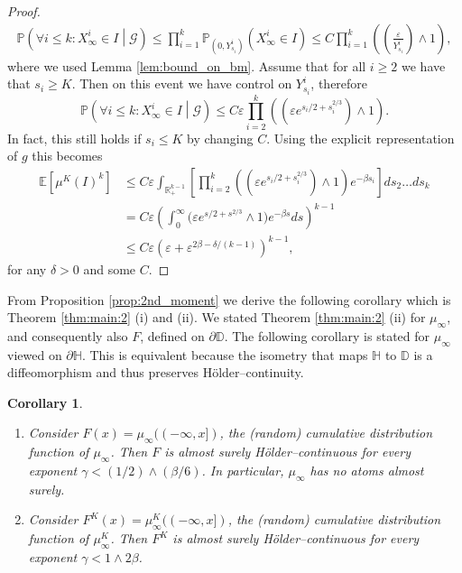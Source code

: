 \documentclass{article}
\newtheorem{cor}[thm]{Corollary}
\theoremstyle{definition}
\numberwithin{equation}{section}
\numberwithin{thm}{section}
\newcommand*{\eps}{\ensuremath{\varepsilon}}            %
\newcommand*{\RR}{\ensuremath{\mathbb{R}}}	        	%
\newcommand*{\EE}{\ensuremath{\mathbb{E}}}	        	%
\newcommand*{\PP}{\ensuremath{\mathbb{P}}}	        	%
\newcommand*{\DD}{\ensuremath{\mathbb{D}}}	        	%
\newcommand*{\HH}{\ensuremath{\mathbb{H}}}	        	%
\begin{document}
\begin{proof}
    \begin{align*}
        \PP\left(\forall i\leq k: X_\infty^i \in I \middle\vert \mathcal{G}\right) \leq \prod_{i=1}^k \PP_{(0,Y_{s_i}^i)}\left(X_\infty^i\in I\right) \leq C \prod_{i=1}^k \left(\left(\frac{\eps}{Y_{s_i}^i}\right)\wedge 1\right),
    \end{align*}
    where we used Lemma \ref{lem:bound_on_bm}. Assume that for all $i\geq 2$ we have that $s_i\geq K$. Then on this event we have control on $Y_{s_i}^i$, therefore
    \begin{equation*}
        \PP\left(\forall i\leq k: X_\infty^i \in I \middle\vert \mathcal{G}\right) \leq C \eps \prod_{i=2}^k \left(\left(\eps e^{s_i/2+s_i^{2/3}}\right)\wedge 1\right).
    \end{equation*}
    In fact, this still holds if $s_i\leq K$ by changing $C$.
    Using the explicit representation of $g$ this becomes
    \begin{align*}
        \EE\left[\mu^K(I)^k\right] &\leq C \eps \int_{\RR_+^{k-1}} \left[\prod_{i=2}^k \left(\left(\eps e^{s_i/2+s_i^{2/3}}\right)\wedge 1 \right)e^{-\beta s_i}\right] ds_2\ldots ds_{k}\\
        &= C\eps \left(\int_0^\infty \big(\eps e^{s/2+s^{2/3}} \wedge 1\big)e^{-\beta s}ds\right)^{k-1} \\
        &\leq C \eps\left(\eps+ \eps^{2\beta -\delta/(k-1)} \right)^{k-1},
    \end{align*}
    for any $\delta >0$ and some $C$. 
\end{proof}

From Proposition \ref{prop:2nd_moment} we derive the following corollary which is Theorem \ref{thm:main:2} (i) and (ii). We stated Theorem \ref{thm:main:2} (ii) for $\mu_\infty$, and consequently also $F$, defined on $\partial \DD$. The following corollary is stated for $\mu_\infty$ viewed on $\partial\HH$. {T}his is equivalent because the isometry that maps $\HH$ to $\DD$ is a diffeomorphism and thus preserves Hölder--continuity.

\begin{cor}\label{cor:hoelder} \hspace{1cm}
    \begin{enumerate}
    \item 
    Consider $F(x)=\mu_\infty((-\infty,x])$, the (random) cumulative distribution function of $\mu_\infty$. Then $F$ is almost surely Hölder--continuous for every exponent $\gamma < (1/2) \wedge (\beta/6)$. In particular, $\mu_\infty$ has no atoms almost surely. 

    \item 
    Consider $F^K(x)=\mu^K_\infty((-\infty,x])$, the (random) cumulative distribution function of $\mu^K_\infty$. Then $F^K$ is almost surely Hölder--continuous for every exponent $\gamma < 1 \wedge 2\beta$.
    \end{enumerate}
\end{cor}
\end{document}
